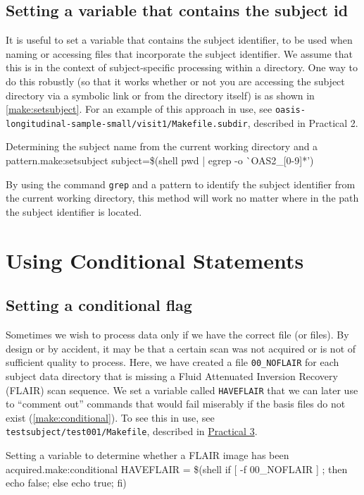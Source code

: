 \subsection{Setting a variable that contains the subject id }
It is useful to set a variable that contains the subject identifier, to be used when naming or accessing files that incorporate the subject identifier. We assume that this is in the context of subject-specific processing within a directory. One way to do this robustly (so that it works whether or not you are accessing the subject directory via a symbolic link or from the directory itself) is as shown in \autoref{make:setsubject}. For an example of this approach in use, see \texttt{oasis-longitudinal-sample-small/visit1/Makefile.subdir}, described in Practical 2.

\begin{make}{Determining the subject name from the current working directory and a pattern.}{make:setsubject}
subject=\$(shell pwd | egrep -o \`{}OAS2_[0-9]*')
\end{make}

By using the command \texttt{grep} and a pattern to identify the subject identifier from the current working directory, this method will work no matter where in the path the subject identifier is located.

\section{Using Conditional Statements}

\subsection{Setting a conditional flag}

Sometimes we wish to process data only if we have the correct file (or files). By design or by accident, it may be that a certain scan was not acquired or is not of sufficient quality to process. Here, we have created a file \texttt{00_NOFLAIR} for each subject data directory that is missing a Fluid Attenuated Inversion Recovery (FLAIR) scan sequence. We set a variable called \texttt{HAVEFLAIR} that we can later use to ``comment out'' commands that would fail miserably if the basis files do not exist (\autoref{make:conditional}). To see this in use, see \texttt{testsubject/test001/Makefile}, described in \hyperref[sec:practicum3]{Practical 3}.

\begin{make}{Setting a variable to determine whether a FLAIR image has been acquired.}{make:conditional}
HAVEFLAIR = \$(shell if [ -f 00_NOFLAIR ] ; then echo false; else echo true; fi)
\end{make}

